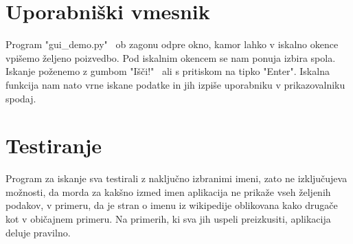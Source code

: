 \documentclass[a4paper, 12pt]{article}
\begin{document}
\section{Uporabniški vmesnik}

Program  "gui\_demo.py"~ ob zagonu odpre okno, kamor lahko v iskalno okence vpišemo željeno poizvedbo. Pod iskalnim okencem se nam ponuja izbira spola. Iskanje poženemo z gumbom "Išči!"~ ali s pritiskom na tipko "Enter". Iskalna funkcija nam nato vrne iskane podatke in jih izpiše uporabniku v prikazovalniku spodaj.

\section{Testiranje}
Program za iskanje sva testirali z naključno izbranimi imeni, zato ne izključujeva možnosti, da morda za kakšno izmed imen aplikacija ne prikaže vseh željenih podakov, v primeru, da je stran o imenu iz wikipedije oblikovana kako drugače kot v običajnem primeru. Na primerih, ki sva jih uspeli preizkusiti, aplikacija deluje pravilno.
\end{document}
